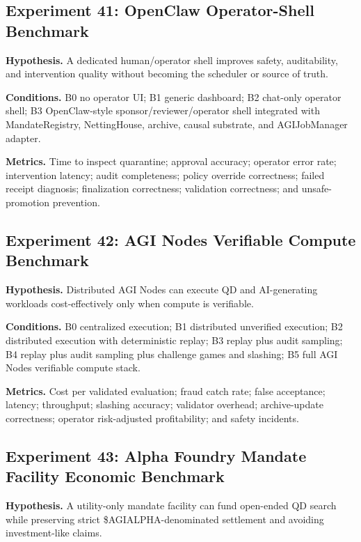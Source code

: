 \documentclass[
  11pt,
]{article}
\begin{document}
\subsection{Experiment 41: OpenClaw Operator-Shell
Benchmark}\label{experiment-41-openclaw-operator-shell-benchmark}

\textbf{Hypothesis.} A dedicated human/operator shell improves safety,
auditability, and intervention quality without becoming the scheduler or
source of truth.

\textbf{Conditions.} B0 no operator UI; B1 generic dashboard; B2
chat-only operator shell; B3 OpenClaw-style sponsor/reviewer/operator
shell integrated with MandateRegistry, NettingHouse, archive, causal
substrate, and AGIJobManager adapter.

\textbf{Metrics.} Time to inspect quarantine; approval accuracy;
operator error rate; intervention latency; audit completeness; policy
override correctness; failed receipt diagnosis; finalization
correctness; validation correctness; and unsafe-promotion prevention.

\subsection{Experiment 42: AGI Nodes Verifiable Compute
Benchmark}\label{experiment-42-agi-nodes-verifiable-compute-benchmark}

\textbf{Hypothesis.} Distributed AGI Nodes can execute QD and
AI-generating workloads cost-effectively only when compute is
verifiable.

\textbf{Conditions.} B0 centralized execution; B1 distributed unverified
execution; B2 distributed execution with deterministic replay; B3 replay
plus audit sampling; B4 replay plus audit sampling plus challenge games
and slashing; B5 full AGI Nodes verifiable compute stack.

\textbf{Metrics.} Cost per validated evaluation; fraud catch rate; false
acceptance; latency; throughput; slashing accuracy; validator overhead;
archive-update correctness; operator risk-adjusted profitability; and
safety incidents.

\subsection{Experiment 43: Alpha Foundry Mandate Facility Economic
Benchmark}\label{experiment-43-alpha-foundry-mandate-facility-economic-benchmark}

\textbf{Hypothesis.} A utility-only mandate facility can fund open-ended
QD search while preserving strict \$AGIALPHA-denominated settlement and
avoiding investment-like claims.
\end{document}
